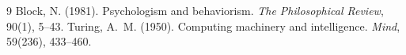 \documentclass{situationist-preprint}
\begin{document}
\begin{thebibliography}{9}\small
{} Block, N. (1981). Psychologism and behaviorism. \emph{The Philosophical Review}, 90(1), 5--43.
 Turing, A.~M. (1950). Computing machinery and intelligence. \emph{Mind}, 59(236), 433--460.
\end{thebibliography}
\end{document}
